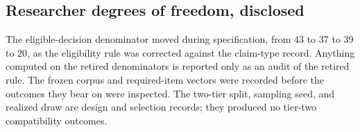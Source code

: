 \subsection{Researcher degrees of freedom, disclosed}

The eligible-decision denominator moved during specification, from 43 to 37 to 39 to 20, as
the eligibility rule was corrected against the claim-type record. Anything computed on the
retired denominators is reported only as an audit of the retired rule. The frozen corpus and
required-item vectors were recorded before the outcomes they bear on were inspected. The
two-tier split, sampling seed, and realized draw are design and selection records; they produced
no tier-two compatibility outcomes.
